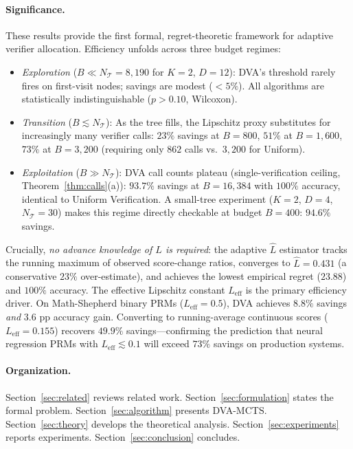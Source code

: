 \paragraph{Significance.}
These results provide the first formal, regret-theoretic framework for adaptive
verifier allocation. Efficiency unfolds across three budget regimes:

\begin{itemize}
  \item \emph{Exploration} ($B \ll N_{\mathcal{T}}{=}8{,}190$ for $K{=}2$, $D{=}12$):
    DVA's threshold rarely fires on first-visit nodes; savings are modest (${<}5\%$).
    All algorithms are statistically indistinguishable ($p{>}0.10$, Wilcoxon).

  \item \emph{Transition} ($B \lesssim N_{\mathcal{T}}$):
    As the tree fills, the Lipschitz proxy substitutes for increasingly many verifier
    calls: $23\%$ savings at $B{=}800$, $51\%$ at $B{=}1{,}600$,
    $73\%$ at $B{=}3{,}200$ (requiring only $862$ calls vs.\ $3{,}200$ for Uniform).

  \item \emph{Exploitation} ($B \gg N_{\mathcal{T}}$):
    DVA call counts plateau (single-verification ceiling, Theorem~\ref{thm:calls}(a)):
    $\mathbf{93.7\%}$ savings at $B{=}16{,}384$ with $100\%$ accuracy,
    identical to Uniform Verification.
    A small-tree experiment ($K{=}2$, $D{=}4$, $N_{\mathcal{T}}{=}30$) makes this
    regime directly checkable at budget $B{=}400$: $94.6\%$ savings.
\end{itemize}

Crucially, \emph{no advance knowledge of $L$ is required}: the adaptive
$\hat{L}$ estimator tracks the running maximum of observed score-change ratios,
converges to $\hat{L}{=}0.431$ (a conservative $23\%$ over-estimate), and achieves
the lowest empirical regret ($23.88$) and $100\%$ accuracy.
The effective Lipschitz constant $L_{\text{eff}}$ is the primary efficiency driver.
On Math-Shepherd binary PRMs ($L_{\text{eff}}{=}0.5$), DVA achieves $8.8\%$ savings
\emph{and} $3.6$ pp accuracy gain. Converting to running-average continuous scores
($L_{\text{eff}}{=}0.155$) recovers $\mathbf{49.9\%}$ savings---confirming the
prediction that neural regression PRMs with $L_{\text{eff}} \lesssim 0.1$ will
exceed $73\%$ savings on production systems.

\paragraph{Organization.}
Section~\ref{sec:related} reviews related work. Section~\ref{sec:formulation}
states the formal problem. Section~\ref{sec:algorithm} presents DVA-MCTS.
Section~\ref{sec:theory} develops the theoretical analysis.
Section~\ref{sec:experiments} reports experiments. Section~\ref{sec:conclusion}
concludes.
